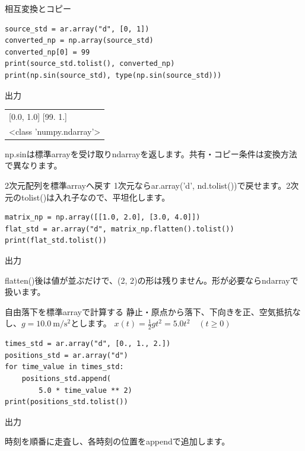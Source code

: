 \documentclass[12pt,aspectratio=43]{beamer}
\newcommand{\code}[1]{{\codefont #1}}
\newcommand{\out}[1]{%
  \par\vspace{.5mm}\noindent
  {\small\textcolor{black!60}{出力}}\hspace{1mm}%
  \begin{minipage}[t]{.88\linewidth}\vspace{0pt}%
    {\codefont\fontsize{11}{12.5}\selectfont #1}%
  \end{minipage}\par}
\begin{document}
\begin{frame}[t,fragile]{相互変換とコピー}
\vspace{-1mm}
\begin{lstlisting}
source_std = ar.array("d", [0, 1])
converted_np = np.array(source_std)
converted_np[0] = 99
print(source_std.tolist(), converted_np)
print(np.sin(source_std), type(np.sin(source_std)))
\end{lstlisting}
  \out{\begin{tabular}{@{}l@{}}
    [0.0, 1.0] [99.  1.]\\\relax
    [0.         0.84147098] \textless class 'numpy.ndarray'\textgreater
  \end{tabular}}
  \small \code{np.sin}は標準\code{array}を受け取り\code{ndarray}を返します。共有・コピー条件は変換方法で異なります。
\end{frame}

\begin{frame}[t,fragile]{2次元配列を標準\code{array}へ戻す}
  \small 1次元なら\code{ar.array('d', nd.tolist())}で戻せます。2次元の\code{tolist()}は入れ子なので、平坦化します。
\begin{lstlisting}
matrix_np = np.array([[1.0, 2.0], [3.0, 4.0]])
flat_std = ar.array("d", matrix_np.flatten().tolist())
print(flat_std.tolist())
\end{lstlisting}
  \out{[1.0, 2.0, 3.0, 4.0]}
  \small \code{flatten()}後は値が並ぶだけで、\code{(2, 2)}の形は残りません。形が必要なら\code{ndarray}で扱います。
\end{frame}

\begin{frame}[t,fragile]{自由落下を標準\code{array}で計算する}
  \small 静止・原点から落下、下向きを正、空気抵抗なし、\(g=10.0\ \mathrm{m/s^2}\)とします。
  \(\displaystyle x(t)=\frac{1}{2}gt^2=5.0t^2\quad(t\geq0)\)
\begin{lstlisting}
times_std = ar.array("d", [0., 1., 2.])
positions_std = ar.array("d")
for time_value in times_std:
    positions_std.append(
        5.0 * time_value ** 2)
print(positions_std.tolist())
\end{lstlisting}
  \out{[0.0, 5.0, 20.0]}
  \small 時刻を順番に走査し、各時刻の位置を\code{append}で追加します。
\end{frame}
\end{document}

